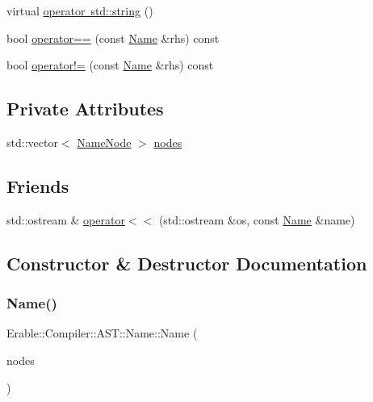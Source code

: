 \begin{DoxyCompactItemize}
\item 
virtual \mbox{\hyperlink{class_erable_1_1_compiler_1_1_a_s_t_1_1_name_a63144a811ca653d23d183f0eb9854f91}{operator std\+::string}} ()
\item 
bool \mbox{\hyperlink{class_erable_1_1_compiler_1_1_a_s_t_1_1_name_aa26d24be67e4c1360beecb7a915fe8e9}{operator==}} (const \mbox{\hyperlink{class_erable_1_1_compiler_1_1_a_s_t_1_1_name}{Name}} \&rhs) const
\item 
bool \mbox{\hyperlink{class_erable_1_1_compiler_1_1_a_s_t_1_1_name_a9ece316c8aa0b9359b5d57b8c9a4b7c1}{operator!=}} (const \mbox{\hyperlink{class_erable_1_1_compiler_1_1_a_s_t_1_1_name}{Name}} \&rhs) const
\end{DoxyCompactItemize}
\subsection*{Private Attributes}
\begin{DoxyCompactItemize}
\item 
std\+::vector$<$ \mbox{\hyperlink{struct_erable_1_1_compiler_1_1_a_s_t_1_1_name_node}{Name\+Node}} $>$ \mbox{\hyperlink{class_erable_1_1_compiler_1_1_a_s_t_1_1_name_ad0f349d658f7d1300785b37fac094305}{nodes}}
\end{DoxyCompactItemize}
\subsection*{Friends}
\begin{DoxyCompactItemize}
\item 
std\+::ostream \& \mbox{\hyperlink{class_erable_1_1_compiler_1_1_a_s_t_1_1_name_a6aacec03a456bb828ba18f86f151078f}{operator$<$$<$}} (std\+::ostream \&os, const \mbox{\hyperlink{class_erable_1_1_compiler_1_1_a_s_t_1_1_name}{Name}} \&name)
\end{DoxyCompactItemize}


\subsection{Constructor \& Destructor Documentation}
\mbox{\label{class_erable_1_1_compiler_1_1_a_s_t_1_1_name_ac61ea71fc982ffd3acbdb05d3b707d0f}} 
\subsubsection{\texorpdfstring{Name()}{Name()}\hspace{0.1cm}{\footnotesize\ttfamily [1/2]}}
{\footnotesize\ttfamily Erable\+::\+Compiler\+::\+A\+S\+T\+::\+Name\+::\+Name (\begin{DoxyParamCaption}\item[{std\+::vector$<$ \mbox{\hyperlink{struct_erable_1_1_compiler_1_1_a_s_t_1_1_name_node}{Name\+Node}} $>$}]{nodes }\end{DoxyParamCaption})\hspace{0.3cm}{\ttfamily [explicit]}}

